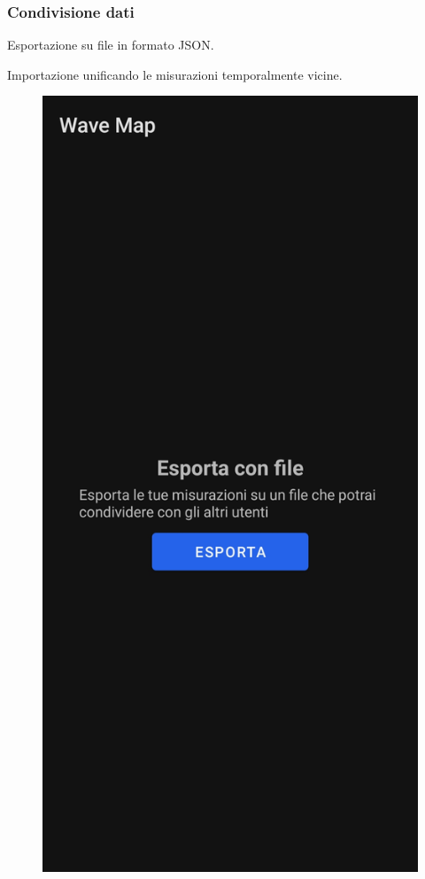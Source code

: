 \documentclass{beamer}
\begin{document}
\begin{frame}
    \frametitle{Condivisione dati}

    Esportazione su file in formato JSON.

    Importazione unificando le misurazioni temporalmente vicine.

    \begin{figure}[H]
        \centering
        \begin{minipage}[b]{0.25\textwidth}
          \includegraphics[width=\textwidth]{./img/overview/export1.jpg}

\end{minipage}
\end{figure}
\end{frame}
\end{document}
